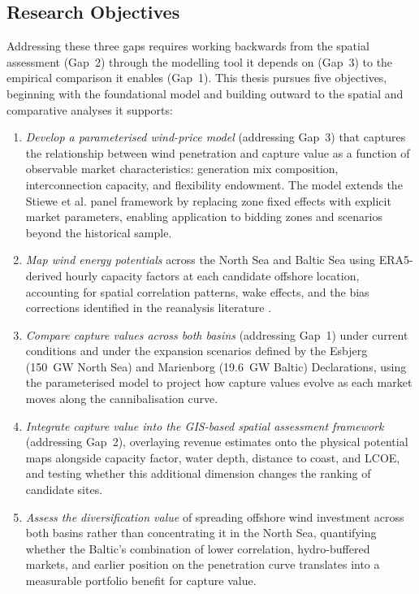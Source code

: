 \vspace{4pt}

\subsection{Research Objectives}\label{sec:objectives}

Addressing these three gaps requires working backwards from the spatial assessment (Gap~2) through the modelling tool it depends on (Gap~3) to the empirical comparison it enables (Gap~1). This thesis pursues five objectives, beginning with the foundational model and building outward to the spatial and comparative analyses it supports:

\begin{enumerate}
    \item \textit{Develop a parameterised wind-price model} (addressing Gap~3) that captures the relationship between wind penetration and capture value as a function of observable market characteristics: generation mix composition, interconnection capacity, and flexibility endowment. The model extends the Stiewe et al. \cite{Stiewe2025} panel framework by replacing zone fixed effects with explicit market parameters, enabling application to bidding zones and scenarios beyond the historical sample.

    \item \textit{Map wind energy potentials} across the North Sea and Baltic Sea using ERA5-derived hourly capacity factors at each candidate offshore location, accounting for spatial correlation patterns, wake effects, and the bias corrections identified in the reanalysis literature \cite{Gandoin2024, Staffell2016}.

    \item \textit{Compare capture values across both basins} (addressing Gap~1) under current conditions and under the expansion scenarios defined by the Esbjerg (150~GW North Sea) and Marienborg (19.6~GW Baltic) Declarations, using the parameterised model to project how capture values evolve as each market moves along the cannibalisation curve.

    \item \textit{Integrate capture value into the GIS-based spatial assessment framework} (addressing Gap~2), overlaying revenue estimates onto the physical potential maps alongside capacity factor, water depth, distance to coast, and LCOE, and testing whether this additional dimension changes the ranking of candidate sites.

    \item \textit{Assess the diversification value} of spreading offshore wind investment across both basins rather than concentrating it in the North Sea, quantifying whether the Baltic's combination of lower correlation, hydro-buffered markets, and earlier position on the penetration curve translates into a measurable portfolio benefit for capture value.
\end{enumerate}

